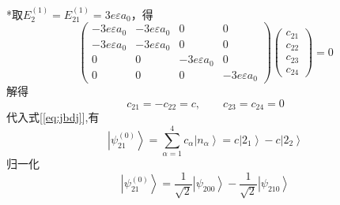 \begin{frame}
  \frametitle{}
  *取$E^{(1)}_2=E^{(1)}_{21} = 3e\varepsilon a_0 $，得
  \begin{equation*}
    \begin{pmatrix}-3e\varepsilon a_0 & -3e\varepsilon a_0 & 0 & 0 \\
      -3e\varepsilon a_0 & -3e\varepsilon a_0 & 0 & 0 \\
      0 & 0 & -3e\varepsilon a_0 & 0 \\
      0 & 0 & 0 & -3e\varepsilon a_0 \end{pmatrix}
      \begin{pmatrix}c_{2 1} \\c_{2 2} \\ c_{2 3} \\c_{2 4} \end{pmatrix} =0
  \end{equation*}
  解得 
  \[ c_{2 1} = - c_{2 2} =c, \qquad c_{2 3} = c_{2 4} =0 \]
  代入式[\ref{eq:jbdj}],有
  \begin{equation*}
    \left\vert \psi ^{(0)}_{21} \right\rangle = \sum_{\alpha=1}^4
    c_\alpha \left\vert n_\alpha \right\rangle = c \left\vert 2_1 \right\rangle
    -c \left\vert 2_2 \right\rangle \end{equation*}
    归一化
    \begin{equation*}
      \left\vert \psi ^{(0)}_{21} \right\rangle = \frac{1}{\sqrt{2} } \left\vert \psi _{200} \right\rangle
      -\frac{1}{\sqrt{2} } \left\vert\psi _{210} \right\rangle \end{equation*}
\end{frame} 
 
